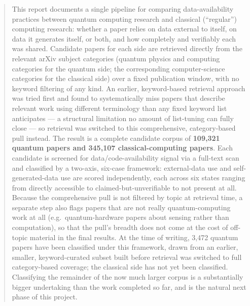 \begin{abstract}
This report documents a single pipeline for comparing data-availability practices
between quantum computing research and classical (``regular'') computing research:
whether a paper relies on data external to itself, on data it generates itself, or
both, and how completely and verifiably each was shared. Candidate papers for each
side are retrieved directly from the relevant arXiv subject categories (quantum
physics and computing categories for the quantum side; the corresponding
computer-science categories for the classical side) over a fixed publication window,
with no keyword filtering of any kind. An earlier, keyword-based retrieval approach
was tried first and found to systematically miss papers that describe relevant work
using different terminology than any fixed keyword list anticipates --- a structural
limitation no amount of list-tuning can fully close --- so retrieval was switched to
this comprehensive, category-based pull instead. The result is a complete candidate
corpus of \textbf{109{,}321 quantum papers and 345{,}107 classical-computing papers}.
Each candidate is screened for data/code-availability signal via a full-text scan and
classified by a two-axis, six-case framework: external-data use and self-generated-data
use are scored independently, each across six states ranging from directly accessible
to claimed-but-unverifiable to not present at all. Because the comprehensive pull is
not filtered by topic at retrieval time, a separate step also flags papers that are not
really quantum-computing work at all (e.g.\ quantum-hardware papers about sensing
rather than computation), so that the pull's breadth does not come at the cost of
off-topic material in the final results. At the time of writing, 3{,}472 quantum
papers have been classified under this framework, drawn from an earlier, smaller,
keyword-curated subset built before retrieval was switched to full category-based
coverage; the classical side has not yet been classified. Classifying the remainder of
the now much larger corpus is a substantially bigger undertaking than the work
completed so far, and is the natural next phase of this project.
\end{abstract}
